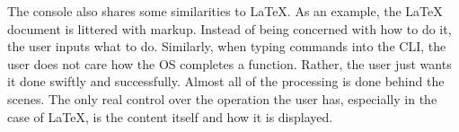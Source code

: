 \documentclass[letterpaper, 10pt,DIV=13]{scrartcl}
\numberwithin{equation}{section} %
\numberwithin{figure}{section} %
\numberwithin{table}{section} %
\begin{document}
The console also shares some similarities to LaTeX. As an example, the LaTeX document is littered with markup. Instead of being concerned with how to do it, the user inputs what to do. Similarly, when typing commands into the CLI, the user does not care how the OS completes a function. Rather, the user just wants it done swiftly and successfully. Almost all of the processing is done behind the scenes. The only real control over the operation the user has, especially in the case of LaTeX, is the content itself and how it is displayed.



\pagebreak
\end{document}
